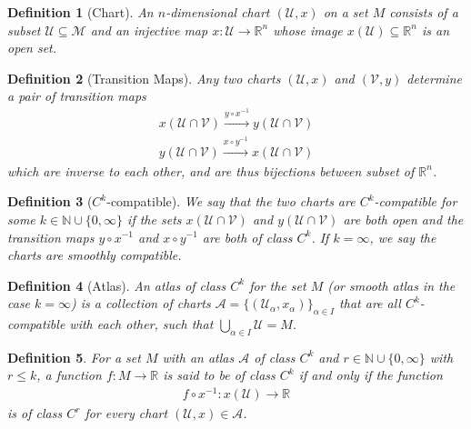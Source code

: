 \documentclass{book}
\theoremstyle{custom_definition}
\newtheorem{definition}{Definition}
\theoremstyle{custom_theorem}
\begin{document}
    \begin{definition}[Chart]
        An \(n\)-dimensional chart \((\mathcal{U}, x)\) on a set \(M\) consists of a subset \(\mathcal{U \subseteq M}\) and an injective map \(x: \mathcal{U} \longrightarrow \mathbb{R}^n\) whose image \(x(\mathcal{U}) \subseteq \mathbb{R}^n\) is an open set.
    \end{definition}
    \begin{definition}[Transition Maps]
        Any two charts \((\mathcal{U}, x)\) and \((\mathcal{V}, y)\) determine a pair of transition maps
        \begin{align}
            x(\mathcal{U} \cap \mathcal{V}) \xrightarrow{y \circ x^{-1}} y(\mathcal{U} \cap \mathcal{V}) \\
            y(\mathcal{U} \cap \mathcal{V}) \xrightarrow{x \circ y^{-1}} x(\mathcal{U} \cap \mathcal{V})
        \end{align}
        which are inverse to each other, and are thus bijections between subset of \(\mathbb{R}^n\).
    \end{definition}
    \begin{definition}[\(C^k\)-compatible]
        We say that the two charts are \(C^k\)-compatible for some \(k \in \mathbb{N} \cup \{0, \infty\}\) if the sets \(x(\mathcal{U} \cap \mathcal{V})\) and \(y(\mathcal{U} \cap \mathcal{V})\) are both open and the transition maps \(y \circ x^{-1}\) and \(x \circ y^{-1}\) are both of class \(C^k\). If \(k = \infty\), we say the charts are smoothly compatible.
    \end{definition}
    \begin{definition}[Atlas]
        An atlas of class \(C^k\) for the set \(M\) (or smooth atlas in the case \(k = \infty\)) is a collection of charts \(\mathcal{A} = \{(\mathcal{U}_\alpha, x_\alpha)\}_{\alpha \in I}\) that are all \(C^k\)-compatible with each other, such that \(\bigcup_{\alpha \in I} \mathcal{U} = M\).
    \end{definition}
    \begin{definition}
        For a set \(M\) with an atlas \(\mathcal{A}\) of class \(C^k\) and \(r \in \mathbb{N} \cup \{0, \infty\}\) with \(r \leq k\), a function \(f: M \longrightarrow \mathbb{R}\) is said to be of class \(C^k\) if and only if the function
        \begin{align}
            f \circ x^{-1}: x(\mathcal{U}) \longrightarrow \mathbb{R}
        \end{align}
        is of class \(C^r\) for every chart \((\mathcal{U}, x) \in \mathcal{A}\).
    \end{definition}
\end{document}
